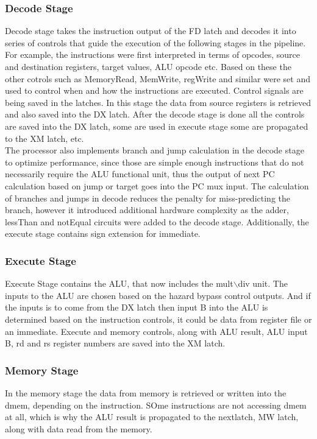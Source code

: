 \documentclass{article}
\begin{document}
\subsubsection{Decode Stage}
Decode stage takes the instruction output of the FD latch and  decodes it into series of controls that guide the execution of the following stages in the pipeline. For example, the instructions were first interpreted in terms of opcodes, source and destination registers, target values, ALU opcode etc. Based on these the other cotrols such as MemoryRead, MemWrite, regWrite and similar were set and used to control when and how the instructions are executed. Control signals are being saved in the latches. In this stage the data from source registers is retrieved and also saved into the DX latch. After the decode stage is done all the controls are saved into the DX latch, some are used in execute stage some are propagated to the XM latch, etc. \\
The processor also implements branch and jump calculation in the decode stage to optimize performance, since those are simple enough instructions that do not necessarily require the ALU functional unit, thus the output of next PC calculation based on jump or target goes into the PC mux input. The calculation of branches and jumps in decode reduces the penalty for miss-predicting the branch, however it introduced additional hardware complexity as the adder, lessThan and notEqual circuits were added to the decode stage. Additionally, the execute stage contains sign extension for immediate.

\subsubsection{Execute Stage}
Execute Stage contains the ALU, that now includes the mult$\backslash$div unit. The inputs to the ALU are chosen based on the hazard bypass control outputs. And if the inputs is to come from the DX latch then input B into the ALU is determined based on the instruction controls, it could be data from register file or an immediate. Execute and memory controls, along with ALU result, ALU input B, rd and rs register numbers are saved into the XM latch.
\subsubsection{Memory Stage}
In the memory stage the data from memory is retrieved or written into the dmem, depending on the instruction. SOme instructions are not accessing dmem at all, which is why the ALU result is propagated to the nextlatch, MW latch, along with data read from the memory. 
\end{document}
